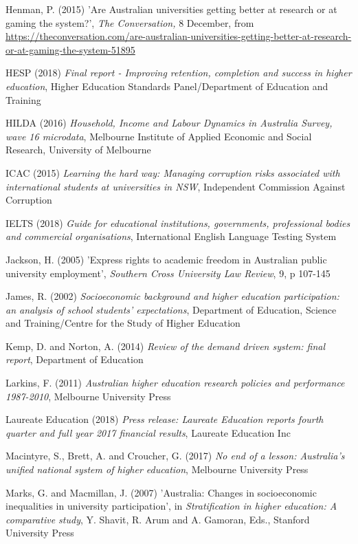 \documentclass[]{book}
\begin{document}
Henman, P. (2015) 'Are Australian universities getting better at research or at gaming the system?', \emph{The Conversation,} 8 December, from \url{https://theconversation.com/are-australian-universities-getting-better-at-research-or-at-gaming-the-system-51895}

HESP (2018) \emph{Final report - Improving retention, completion and success in higher education}, Higher Education Standards Panel/Department of Education and Training

\protect\hypertarget{_ENREF_130}{}{}HILDA (2016) \emph{Household, Income and Labour Dynamics in Australia Survey, wave 16 microdata}, Melbourne Institute of Applied Economic and Social Research, University of Melbourne

ICAC (2015) \emph{Learning the hard way: Managing corruption risks associated with international students at universities in NSW}, Independent Commission Against Corruption

IELTS (2018) \emph{Guide for educational institutions, governments, professional bodies and commercial organisations}, International English Language Testing System

Jackson, H. (2005) 'Express rights to academic freedom in Australian public university employment', \emph{Southern Cross University Law Review}, 9, p 107-145

James, R. (2002) \emph{Socioeconomic background and higher education participation: an analysis of school students' expectations}, Department of Education, Science and Training/Centre for the Study of Higher Education

Kemp, D. and Norton, A. (2014) \emph{Review of the demand driven system: final report}, Department of Education

Larkins, F. (2011) \emph{Australian higher education research policies and performance 1987-2010}, Melbourne University Press

Laureate Education (2018) \emph{Press release: Laureate Education reports fourth quarter and full year 2017 financial results}, Laureate Education Inc

Macintyre, S., Brett, A. and Croucher, G. (2017) \emph{No end of a lesson: Australia's unified national system of higher education}, Melbourne University Press

Marks, G. and Macmillan, J. (2007) 'Australia: Changes in socioeconomic inequalities in university participation', in \emph{Stratification in higher education: A comparative study}, Y. Shavit, R. Arum and A. Gamoran, Eds., Stanford University Press
\end{document}
